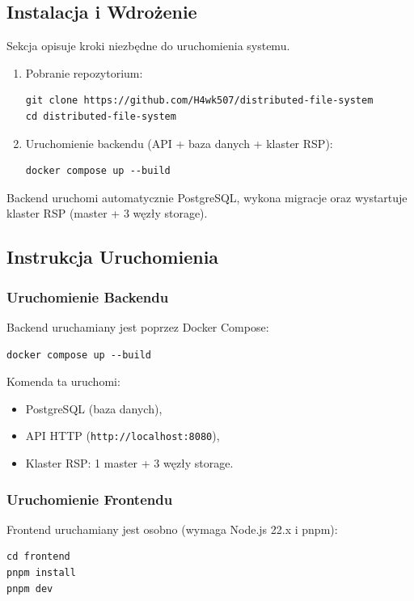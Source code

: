 \documentclass[12pt,a4paper]{article}
\begin{document}
\subsection{Instalacja i Wdrożenie}
Sekcja opisuje kroki niezbędne do uruchomienia systemu.

\begin{enumerate}
    \item Pobranie repozytorium:
\begin{verbatim}
git clone https://github.com/H4wk507/distributed-file-system
cd distributed-file-system
\end{verbatim}

    \item Uruchomienie backendu (API + baza danych + klaster RSP):
\begin{verbatim}
docker compose up --build
\end{verbatim}
\end{enumerate}

Backend uruchomi automatycznie PostgreSQL, wykona migracje oraz wystartuje klaster RSP (master + 3 węzły storage).

\subsection{Instrukcja Uruchomienia}

\subsubsection{Uruchomienie Backendu}
Backend uruchamiany jest poprzez Docker Compose:
\begin{verbatim}
docker compose up --build
\end{verbatim}

Komenda ta uruchomi:
\begin{itemize}
    \item PostgreSQL (baza danych),
    \item API HTTP (\texttt{http://localhost:8080}),
    \item Klaster RSP: 1 master + 3 węzły storage.
\end{itemize}

\subsubsection{Uruchomienie Frontendu}
Frontend uruchamiany jest osobno (wymaga Node.js 22.x i pnpm):
\begin{verbatim}
cd frontend
pnpm install
pnpm dev
\end{verbatim}
\end{document}
